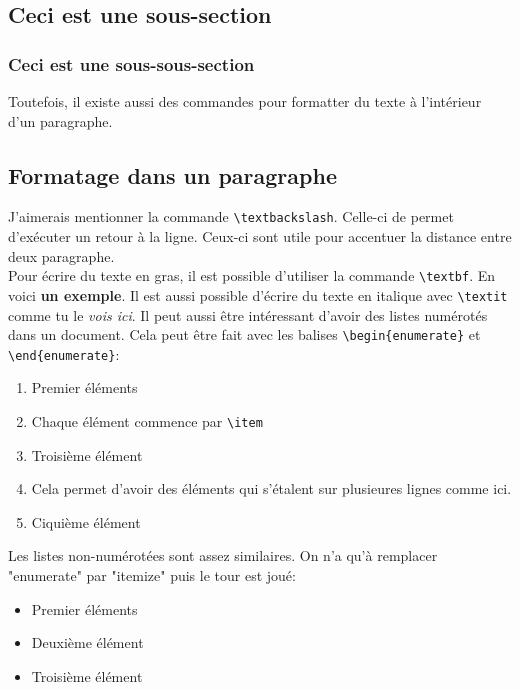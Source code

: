 \documentclass[a4paper, 10pt]{article}
\begin{document}
\subsection{Ceci est une sous-section}
\subsubsection{Ceci est une sous-sous-section}

Toutefois, il existe aussi des commandes pour formatter du texte à l'intérieur
d'un paragraphe.

\subsection{Formatage dans un paragraphe}

J'aimerais mentionner la commande \verb+\textbackslash+. Celle-ci de
permet d'exécuter un retour à la ligne. Ceux-ci sont utile pour accentuer la
distance entre deux paragraphe. \\

Pour écrire du texte en gras, il est possible d'utiliser la commande
\verb+\textbf+. En voici \textbf{un exemple}. Il est aussi possible
d'écrire du texte en italique avec \verb+\textit+ comme tu le
\textit{vois ici}. Il peut aussi être intéressant d'avoir des listes numérotés
dans un document. Cela peut être fait avec les balises
\verb+\begin{enumerate}+ et \verb+\end{enumerate}+:

\begin{enumerate}
  \item Premier éléments
  \item Chaque élément commence par \verb+\item+
  \item Troisième élément
  \item Cela permet d'avoir des
    éléments qui s'étalent
    sur plusieures lignes comme ici.
  \item Ciquième élément \\
\end{enumerate}

Les listes non-numérotées sont assez similaires. On n'a qu'à remplacer
"enumerate" par "itemize" puis le tour est joué:

\begin{itemize}
  \item Premier éléments
  \item Deuxième élément
  \item Troisième élément \\
\end{itemize}
\end{document}
